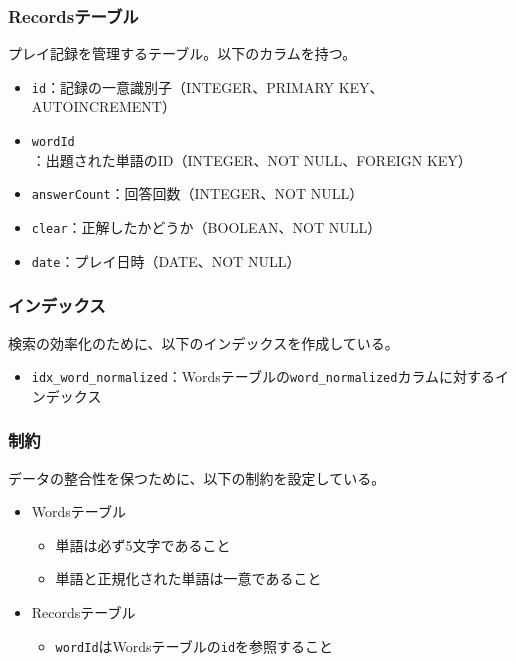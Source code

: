 \documentclass[a4j]{ujarticle}
\begin{document}
\subsubsection{Recordsテーブル}
プレイ記録を管理するテーブル。以下のカラムを持つ。
\begin{itemize}
  \item \texttt{id}：記録の一意識別子（INTEGER、PRIMARY KEY、AUTOINCREMENT）
  \item \texttt{wordId}：出題された単語のID（INTEGER、NOT NULL、FOREIGN KEY）
  \item \texttt{answerCount}：回答回数（INTEGER、NOT NULL）
  \item \texttt{clear}：正解したかどうか（BOOLEAN、NOT NULL）
  \item \texttt{date}：プレイ日時（DATE、NOT NULL）
\end{itemize}

\subsubsection{インデックス}
検索の効率化のために、以下のインデックスを作成している。
\begin{itemize}
  \item \texttt{idx\_word\_normalized}：Wordsテーブルの\texttt{word\_normalized}カラムに対するインデックス
\end{itemize}

\subsubsection{制約}
データの整合性を保つために、以下の制約を設定している。
\begin{itemize}
  \item Wordsテーブル
  \begin{itemize}
    \item 単語は必ず5文字であること
    \item 単語と正規化された単語は一意であること
  \end{itemize}
  \item Recordsテーブル
  \begin{itemize}
    \item \texttt{wordId}はWordsテーブルの\texttt{id}を参照すること
  \end{itemize}
\end{itemize}
\end{document}
